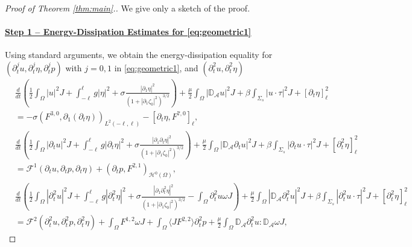\documentclass[letterpaper,reqno,10pt,twoside]{amsart}
\theoremstyle{definition}
\theoremstyle{remark}
\def\p{\partial}
\def\Om{\Omega}
\def\om{\omega}
\begin{document}
		\begin{proof}[Proof of Theorem \ref{thm:main}.]
			We give only a sketch of the proof.
			
			\paragraph{\underline{Step 1 -- Energy-Dissipation Estimates for \eqref{eq:geometric1}}}
			Using standard arguments, we obtain
			the energy-dissipation equality for $(\p_{t}^{j}u, \p_{t}^{j}\eta,\p_{t}^{j}p)$ with $j=0,1$ in \eqref{eq:geometric1}, and $(\p_{t}^{2}u,\p_{t}^{2}\eta)$
			\begin{equation}\label{eq:e_d1}
				\begin{aligned}
					&\frac{d}{dt} \left(\frac12\int_\Om|u|^2J+\int_{-\ell}^\ell g|\eta|^2+\sigma\frac{|\p_1\eta|^2}{(1+|\p_1\zeta_0|^2)^{3/2}}\right)+\frac{\mu}2\int_\Om|\mathbb{D}_{\mathcal{A}}u|^2J+\beta\int_{\Sigma_s}|u\cdot\tau|^2J+[\p_t\eta]_\ell^2\\
					&=-\sigma (F^{3,0}, \p_1(\p_t\eta))_{L^2(-\ell,\ell)}-[\p_t\eta, F^{7,0}]_\ell,
				\end{aligned}
			\end{equation}
			\begin{equation}\label{eq:e_d2}
				\begin{aligned}
					&\frac{d}{dt}\left(\frac12\int_\Om|\p_tu|^2J+\int_{-\ell}^\ell g|\p_t\eta|^2+\sigma\frac{|\p_1\p_t\eta|^2}{(1+|\p_1\zeta_0|^2)^{3/2}}\right)+\frac{\mu}2\int_\Om|\mathbb{D}_{\mathcal{A}}\p_tu|^2J+\beta\int_{\Sigma_s}|\p_tu\cdot\tau|^2 J+[\p_t^2\eta]_\ell^2\\
					&=\mathcal{F}^{1}(\p_tu, \p_tp, \p_t\eta)+(\p_{t}p,F^{2,1})_{\mathcal{H}^{0}(\Omega)},
				\end{aligned}
			\end{equation}
			\begin{equation}\label{eq:e_d3}
				\begin{aligned}
					&\frac{d}{dt}\left(\frac12\int_\Om|\p_t^{2}u|^2J+\int_{-\ell}^\ell g|\p_t^{2}\eta|^2+\sigma\frac{|\p_1\p_t^{2}\eta|^2}{(1+|\p_1\zeta_0|^2)^{3/2}}-\int_{\Omega}\p_{t}^{2}u \om J\right)+\frac{\mu}2\int_\Om|\mathbb{D}_{\mathcal{A}}\p_t^{2}u|^2J+\beta\int_{\Sigma_s}|\p_t^{2}u\cdot\tau|^2 J+[\p_t^2\eta]_\ell^2\\
					&=\mathcal{F}^{2}(\p_t^{2}u, \p_t^{2}p, \p_t^{2}\eta)+\int_{\Omega}F^{1,2}\om J+\int_{\Omega}\langle JF^{2,2}\rangle \p_{t}^{2}p+\frac{\mu}{2}\int_{\Omega}\mathbb{D}_{\mathcal{A}}\p_{t}^{2}u:\mathbb{D}_{\mathcal{A}}\om J,

\end{aligned}
\end{equation}
\end{proof}
\end{document}
